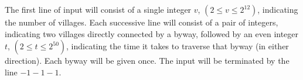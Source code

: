 The first line of input will consist of a single integer $v$, $(2 \le v \le 2^{12})$,
indicating the number of villages. Each successive line will consist of a pair of
integers, indicating two villages directly connected by a byway, followed by an
even integer $t$, $(2 \le t \le 2^{50})$, indicating the time it takes to traverse that
byway (in either direction). Each byway will be given once. The input will be
terminated by the line $-1 -1 -1$.
